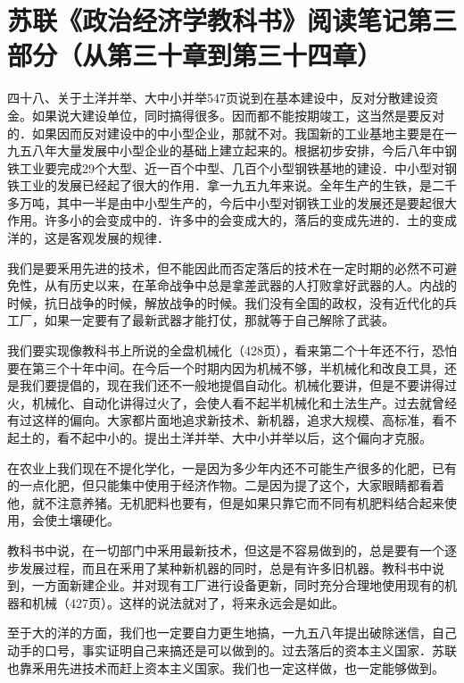 \section[苏联《政治经济学教科书》阅读笔记第三部分（从第三十章到第三十四章）]{苏联《政治经济学教科书》阅读笔记第三部分（从第三十章到第三十四章）}


四十八、关于土洋并举、大中小并举547页说到在基本建设中，反对分散建设资金。如果说大建设单位，同时搞得很多。因而都不能按期竣工，这当然是要反对的．如果因而反对建设中的中小型企业，那就不对。我国新的工业基地主要是在一九五八年大量发展中小型企业的基础上建立起来的。根据初步安排，今后八年中钢铁工业要完成29个大型、近一百个中型、几百个小型钢铁基地的建设．中小型对钢铁工业的发展已经起了很大的作用．拿一九五九年来说。全年生产的生铁，是二千多万吨，其中一半是由中小型生产的，今后中小型对钢铁工业的发展还是要起很大作用。许多小的会变成中的．许多中的会变成大的，落后的变成先进的．土的变成洋的，这是客观发展的规律．

我们是要釆用先进的技术，但不能因此而否定落后的技术在一定时期的必然不可避免性，从有历史以来，在革命战争中总是拿差武器的人打败拿好武器的人。内战的时候，抗日战争的时候，解放战争的时候。我们没有全国的政权，没有近代化的兵工厂，如果一定要有了最新武器才能打仗，那就等于自己解除了武装。

我们要实现像教科书上所说的全盘机械化（428页），看来第二个十年还不行，恐怕要在第三个十年中间。在今后一个时期内因为机械不够，半机械化和改良工具，还是我们要提倡的，现在我们还不一般地提倡自动化。机械化要讲，但是不要讲得过火，机械化、自动化讲得过火了，会使人看不起半机械化和土法生产。过去就曾经有过这样的偏向。大家都片面地追求新技术、新机器，追求大规模、高标准，看不起土的，看不起中小的。提出土洋并举、大中小并举以后，这个偏向才克服。

在农业上我们现在不提化学化，一是因为多少年内还不可能生产很多的化肥，已有的一点化肥，但只能集中使用于经济作物。二是因为提了这个，大家眼睛都看着他，就不注意养猪。无机肥料也要有，但是如果只靠它而不同有机肥料结合起来使用，会使土壤硬化。

教科书中说，在一切部门中釆用最新技术，但这是不容易做到的，总是要有一个逐步发展过程，而且在釆用了某种新机器的同时，总是有许多旧机器。教科书中说到，一方面新建企业。并对现有工厂进行设备更新，同时充分合理地使用现有的机器和机械（427页）。这样的说法就对了，将来永远会是如此。

至于大的洋的方面，我们也一定要自力更生地搞，一九五八年提出破除迷信，自己动手的口号，事实证明自己来搞还是可以做到的。过去落后的资本主义国家．苏联也靠釆用先进技术而赶上资本主义国家。我们也一定这样做，也一定能够做到。

